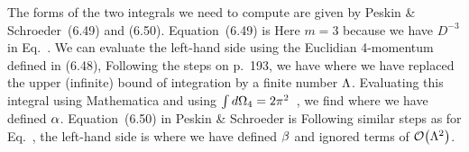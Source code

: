 \documentclass[11pt]{article}
\begin{document}
{	The forms of the two integrals we need to compute are given by Peskin \& Schroeder~(6.49) and (6.50).  Equation~(6.49) is
	Here $m = 3$ because we have $D^{-3}$ in Eq.~.  We can evaluate the left-hand side using the Euclidian 4-momentum defined in (6.48),
	Following the steps on p.~193, we have
	where we have replaced the upper (infinite) bound of integration by a finite number $\Lambda$.  Evaluating this integral using Mathematica and using $\int \dd{\Omega_4} = 2 \pi^2$~\cite[p.~193]{Peskin}, we find
	where we have defined $\alpha$.  Equation~(6.50) in Peskin \& Schroeder is
	Following similar steps as for Eq.~, the left-hand side is
	where we have defined $\beta$ and ignored terms of $\order{\Lam^2}$.
	
}
\end{document}
